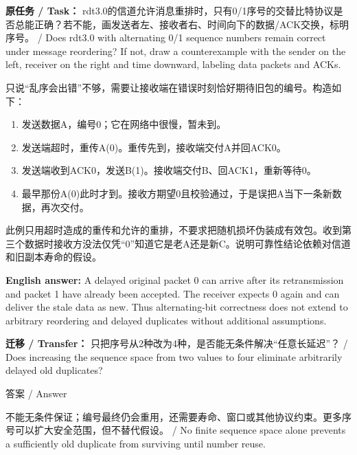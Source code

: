 

\textbf{原任务 / Task：} rdt3.0的信道允许消息重排时，只有0/1序号的交替比特协议是否总能正确？若不能，画发送者左、接收者右、时间向下的数据/ACK交换，标明序号。 / Does rdt3.0 with alternating 0/1 sequence numbers remain correct under message reordering? If not, draw a counterexample with the sender on the left, receiver on the right and time downward, labeling data packets and ACKs.


只说“乱序会出错”不够，需要让接收端在错误时刻恰好期待旧包的编号。构造如下：



\begin{enumerate}[start=1]

\item 发送数据A，编号0；它在网络中很慢，暂未到。

\item 发送端超时，重传A(0)。重传先到，接收端交付A并回ACK0。

\item 发送端收到ACK0，发送B(1)。接收端交付B、回ACK1，重新等待0。

\item 最早那份A(0)此时才到。接收方期望0且校验通过，于是误把A当下一条新数据，再次交付。

\end{enumerate}




此例只用超时造成的重传和允许的重排，不要求把随机损坏伪装成有效包。收到第三个数据时接收方没法仅凭“0”知道它是老A还是新C。说明可靠性结论依赖对信道和旧副本寿命的假设。


\textbf{English answer:} A delayed original packet 0 can arrive after its retransmission and packet 1 have already been accepted. The receiver expects 0 again and can deliver the stale data as new. Thus alternating-bit correctness does not extend to arbitrary reordering and delayed duplicates without additional assumptions.


\textbf{迁移 / Transfer：} 只把序号从2种改为4种，是否能无条件解决“任意长延迟”？ / Does increasing the sequence space from two values to four eliminate arbitrarily delayed old duplicates?



\begin{StudySolution}{答案 / Answer}


不能无条件保证；编号最终仍会重用，还需要寿命、窗口或其他协议约束。更多序号可以扩大安全范围，但不替代假设。 / No finite sequence space alone prevents a sufficiently old duplicate from surviving until number reuse.


\end{StudySolution}



